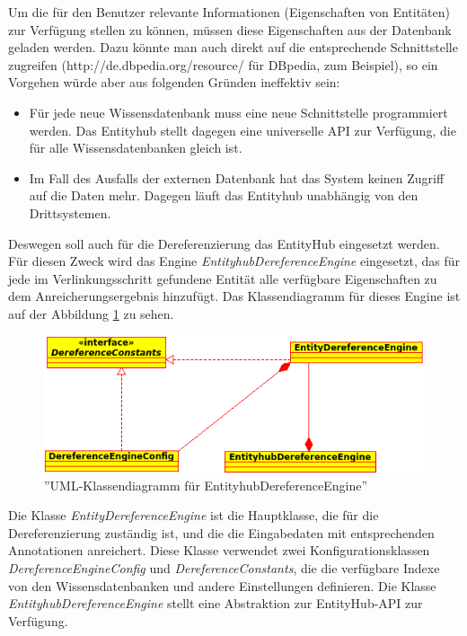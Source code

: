 Um die für den Benutzer relevante Informationen (Eigenschaften von Entitäten) zur Verfügung stellen zu können, müssen diese Eigenschaften aus der Datenbank geladen werden. Dazu könnte man auch direkt auf die entsprechende Schnittstelle zugreifen (http://de.dbpedia.org/resource/ für DBpedia, zum Beispiel), so ein Vorgehen würde aber aus folgenden Gründen ineffektiv sein:
\begin{itemize}
\item Für jede neue Wissensdatenbank muss eine neue Schnittstelle programmiert werden. Das Entityhub stellt dagegen eine universelle API zur Verfügung, die für alle Wissensdatenbanken gleich ist.
\item Im Fall des Ausfalls der externen Datenbank hat das System keinen Zugriff auf die Daten mehr. Dagegen läuft das Entityhub unabhängig von den Drittsystemen. 
\end{itemize}

Deswegen soll auch für die Dereferenzierung das EntityHub eingesetzt werden. Für diesen Zweck wird das Engine \textit{EntityhubDereferenceEngine} eingesetzt, das für jede im Verlinkungsschritt gefundene Entität alle verfügbare Eigenschaften zu dem Anreicherungsergebnis hinzufügt. Das Klassendiagramm für dieses Engine ist auf der Abbildung \ref{fig:deref} zu sehen. 

\begin{figure}[ht]
\centering
\includegraphics[width=\textwidth]{Bilder/deref-uml.png}
\caption{''UML-Klassendiagramm für EntityhubDereferenceEngine''}
\label{fig:deref}
\end{figure}
Die Klasse \textit{EntityDereferenceEngine} ist die Hauptklasse, die für die Dereferenzierung zuständig ist, und die die Eingabedaten mit entsprechenden Annotationen anreichert. Diese Klasse verwendet zwei Konfigurationsklassen \textit{DereferenceEngineConfig} und \textit{DereferenceConstants}, die die verfügbare Indexe von den Wissensdatenbanken und andere Einstellungen definieren. Die Klasse \textit{EntityhubDereferenceEngine} stellt eine Abstraktion zur EntityHub-API zur Verfügung.


